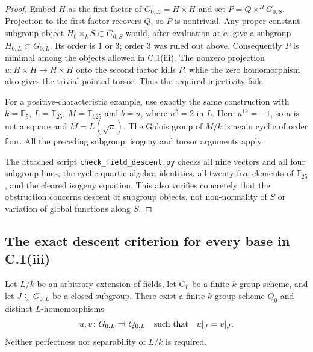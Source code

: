 \begin{proof}
Embed $H$ as the first factor of $G_{0,L}=H\times H$ and set
$P=Q\times^H G_{0,S}$.  Projection to the first factor recovers
$Q$, so $P$ is nontrivial.  Any proper constant subgroup object
$H_0\times_k S\subset G_{0,S}$ would, after evaluation at $a$,
give a subgroup $H_{0,L}\subset G_{0,L}$.  Its order is $1$ or
$3$; order $3$ was ruled out above.  Consequently $P$ is minimal
among the objects allowed in C.1(iii).  The nonzero projection
$u\colon H\times H\to H\times H$ onto the second factor kills
$P$, while the zero homomorphism also gives the trivial pointed
torsor.  Thus the required injectivity fails.

For a positive-characteristic example, use exactly the same
construction with $k=\mathbb F_5$, $L=\mathbb F_{25}$,
$M=\mathbb F_{625}$ and $b=u$, where $u^2=2$ in $L$.
Here $u^{12}=-1$, so $u$ is not a square and $M=L(\sqrt u)$.
The Galois group of $M/k$ is again cyclic of order four.
All the preceding subgroup, isogeny and torsor arguments apply.

The attached script \texttt{check\_field\_descent.py} checks all nine
vectors and all four subgroup lines, the cyclic-quartic algebra
identities, all twenty-five elements of $\mathbb F_{25}$, and the
cleared isogeny equation.  This also verifies concretely that the
obstruction concerns descent of subgroup objects, not non-normality
of $S$ or variation of global functions along $S$.
\end{proof}

\subsection{The exact descent criterion for every base in C.1(iii)}

\begin{lemma}
\label{C:detect-proper-subgroup}
Let $L/k$ be an arbitrary extension of fields, let $G_0$ be a finite
$k$-group scheme, and let $J\subsetneq G_{0,L}$ be a closed subgroup.
There exist a finite $k$-group scheme $Q_0$ and distinct
$L$-homomorphisms
\[
u,v\colon G_{0,L}\rightrightarrows Q_{0,L}
\quad\hbox{such that}\quad u|_J=v|_J.
\]
Neither perfectness nor separability of $L/k$ is required.
\end{lemma}

